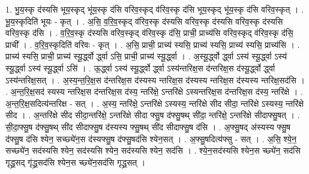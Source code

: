 \documentclass[17pt]{extarticle}
\begin{document}
1. भु॒य॒स्कृ द॑स्यसि भूय॒स्कृद् भू॑य॒स्कृ द॑सि वरिव॒स्कृद् व॑रिव॒स्कृ द॑सि भूय॒स्कृद् भू॑य॒स्कृ द॑सि वरिव॒स्कृत् । . भू॒य॒स्कृदिति॑ भूयः - कृत् । . अ॒सि॒ व॒रि॒व॒स्कृद् व॑रिव॒स्कृ द॑स्यसि वरिव॒स्कृ द॑स्यसि वरिव॒स्कृ द॑स्यसि वरिव॒स्कृ द॑सि । . व॒रि॒व॒स्कृ द॑स्यसि वरिव॒स्कृद् व॑रिव॒स्कृ द॑सि॒ प्राची॒ प्राच्य॑सि वरिव॒स्कृद् व॑रिव॒स्कृ द॑सि॒ प्राची᳚ । . व॒रि॒व॒स्कृदिति॑ वरिवः - कृत् । . अ॒सि॒ प्राची॒ प्राच्य॑ स्यसि॒ प्राच्य॑ स्यसि॒ प्राच्य॑ स्यसि॒ प्राच्य॑सि । . प्राच्य॑ स्यसि॒ प्राची॒ प्राच्य॑ स्यू॒र्द्ध्वो र्द्ध्वा ऽसि॒ प्राची॒ प्राच्य॑ स्यू॒र्द्ध्वा । . अ॒स्यू॒र्द्ध्वो र्द्ध्वा ऽस्य॑ स्यू॒र्द्ध्वा ऽस्य॑ स्यू॒र्द्ध्वा ऽस्य॑ स्यू॒र्द्ध्वा ऽसि॑ । . ऊ॒र्द्ध्वा ऽस्य॑ स्यू॒र्द्ध्वो र्द्ध्वा ऽस्य॑न्तरिक्ष॒स द॑न्तरिक्ष॒स द॑स्यू॒र्द्ध्वो र्द्ध्वा ऽस्य॑न्तरिक्ष॒सत् । . अ॒स्य॒न्त॒रि॒क्ष॒स द॑न्तरिक्ष॒स द॑स्यस्य न्तरिक्ष॒स द॑स्यस्य न्तरिक्ष॒स द॑स्यस्य न्तरिक्ष॒सद॑सि । . अ॒न्त॒रि॒क्ष॒सद॑ स्यस्य न्तरिक्ष॒स द॑न्तरिक्ष॒स द॑स्य॒ न्तरि॑क्षे॒ ऽन्तरि॑क्षे ऽस्यन्तरिक्ष॒स द॑न्तरिक्ष॒स द॑स्य॒ न्तरि॑क्षे । . अ॒न्त॒रि॒क्ष॒सदित्य॑न्तरिक्ष - सत् । . अ॒स्य॒ न्तरि॑क्षे॒ ऽन्तरि॑क्षे ऽस्यस्य॒ न्तरि॑क्षे सीद सीदा॒ न्तरि॑क्षे ऽस्यस्य॒ न्तरि॑क्षे सीद । . अ॒न्तरि॑क्षे सीद सीदा॒न्तरि॑क्षे॒ ऽन्तरि॑क्षे सीदा फ्सु॒ष द॑फ्सु॒षथ् सी॑दा॒ न्तरि॑क्षे॒ ऽन्तरि॑क्षे सीदाफ्सु॒षत् । . सी॒दा॒फ्सु॒ष द॑फ्सु॒षथ् सी॑द सीदाफ्सु॒ष द॑स्यस्य फ्सु॒षथ् सी॑द सीदाफ्सु॒ष द॑सि । . अ॒फ्सु॒षद् अ॑स्यस्य फ्सु॒ष द॑फ्सु॒ष द॑सि श्येन॒ सच्छ्ये॑न॒स द॑स्यफ्सु॒ष द॑फ्सु॒षद॑सि श्येन॒सत् । . अ॒फ्सु॒षदित्य॑फ्सु - सत् । . अ॒सि॒ श्ये॒न॒ सच्छ्ये॑न॒ सद॑स्यसि श्येन॒ सद॑स्यसि श्येन॒ सद॑स्यसि श्येन॒ सद॑सि । . श्ये॒न॒सद॑स्यसि श्येन॒स च्छ्ये॑न॒ सद॑सि गृद्ध्र॒सद् गृ॑द्ध्र॒सद॑सि श्येन॒स च्छ्ये॑न॒सद॑सि गृद्ध्र॒सत् । \newline
\end{document}
